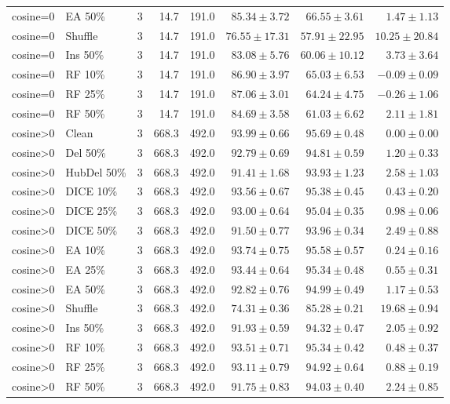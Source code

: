 {\begin{longtable}{llrrrrrr}
cosine=0 & EA 50\% & 3 & 14.7 & 191.0 & $85.34\pm3.72$ & $66.55\pm3.61$ & $1.47\pm1.13$ \\
cosine=0 & Shuffle & 3 & 14.7 & 191.0 & $76.55\pm17.31$ & $57.91\pm22.95$ & $10.25\pm20.84$ \\
cosine=0 & Ins 50\% & 3 & 14.7 & 191.0 & $83.08\pm5.76$ & $60.06\pm10.12$ & $3.73\pm3.64$ \\
cosine=0 & RF 10\% & 3 & 14.7 & 191.0 & $86.90\pm3.97$ & $65.03\pm6.53$ & $-0.09\pm0.09$ \\
cosine=0 & RF 25\% & 3 & 14.7 & 191.0 & $87.06\pm3.01$ & $64.24\pm4.75$ & $-0.26\pm1.06$ \\
cosine=0 & RF 50\% & 3 & 14.7 & 191.0 & $84.69\pm3.58$ & $61.03\pm6.62$ & $2.11\pm1.81$ \\
cosine>0 & Clean & 3 & 668.3 & 492.0 & $93.99\pm0.66$ & $95.69\pm0.48$ & $0.00\pm0.00$ \\
cosine>0 & Del 50\% & 3 & 668.3 & 492.0 & $92.79\pm0.69$ & $94.81\pm0.59$ & $1.20\pm0.33$ \\
cosine>0 & HubDel 50\% & 3 & 668.3 & 492.0 & $91.41\pm1.68$ & $93.93\pm1.23$ & $2.58\pm1.03$ \\
cosine>0 & DICE 10\% & 3 & 668.3 & 492.0 & $93.56\pm0.67$ & $95.38\pm0.45$ & $0.43\pm0.20$ \\
cosine>0 & DICE 25\% & 3 & 668.3 & 492.0 & $93.00\pm0.64$ & $95.04\pm0.35$ & $0.98\pm0.06$ \\
cosine>0 & DICE 50\% & 3 & 668.3 & 492.0 & $91.50\pm0.77$ & $93.96\pm0.34$ & $2.49\pm0.88$ \\
cosine>0 & EA 10\% & 3 & 668.3 & 492.0 & $93.74\pm0.75$ & $95.58\pm0.57$ & $0.24\pm0.16$ \\
cosine>0 & EA 25\% & 3 & 668.3 & 492.0 & $93.44\pm0.64$ & $95.34\pm0.48$ & $0.55\pm0.31$ \\
cosine>0 & EA 50\% & 3 & 668.3 & 492.0 & $92.82\pm0.76$ & $94.99\pm0.49$ & $1.17\pm0.53$ \\
cosine>0 & Shuffle & 3 & 668.3 & 492.0 & $74.31\pm0.36$ & $85.28\pm0.21$ & $19.68\pm0.94$ \\
cosine>0 & Ins 50\% & 3 & 668.3 & 492.0 & $91.93\pm0.59$ & $94.32\pm0.47$ & $2.05\pm0.92$ \\
cosine>0 & RF 10\% & 3 & 668.3 & 492.0 & $93.51\pm0.71$ & $95.34\pm0.42$ & $0.48\pm0.37$ \\
cosine>0 & RF 25\% & 3 & 668.3 & 492.0 & $93.11\pm0.79$ & $94.92\pm0.64$ & $0.88\pm0.19$ \\
cosine>0 & RF 50\% & 3 & 668.3 & 492.0 & $91.75\pm0.83$ & $94.03\pm0.40$ & $2.24\pm0.85$ \\

\end{longtable}}
